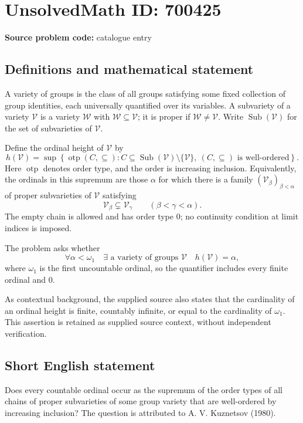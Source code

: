 \documentclass[11pt]{article}
\begin{document}
\section*{UnsolvedMath ID: 700425}
\textbf{Source problem code:} catalogue entry
\subsection{Definitions and mathematical statement}
A variety of groups is the class of all groups satisfying some fixed collection of group identities, each universally quantified over its variables. A subvariety of a variety \(\mathcal V\) is a variety \(\mathcal W\) with \(\mathcal W\subseteq\mathcal V\); it is proper if \(\mathcal W\ne\mathcal V\). Write \(\operatorname{Sub}(\mathcal V)\) for the set of subvarieties of \(\mathcal V\).

Define the ordinal height of \(\mathcal V\) by
\[
h(\mathcal V)=\sup\left\{\operatorname{otp}(C,\subseteq): C\subseteq\operatorname{Sub}(\mathcal V)\setminus\{\mathcal V\},\ (C,\subseteq)\text{ is well-ordered}\right\}.
\]
Here \(\operatorname{otp}\) denotes order type, and the order is increasing inclusion. Equivalently, the ordinals in this supremum are those \(\alpha\) for which there is a family \((\mathcal V_\beta)_{\beta<\alpha}\) of proper subvarieties of \(\mathcal V\) satisfying
\[
\mathcal V_\beta\subsetneq\mathcal V_\gamma\qquad(\beta<\gamma<\alpha).
\]
The empty chain is allowed and has order type \(0\); no continuity condition at limit indices is imposed.

The problem asks whether
\[
\forall\alpha<\omega_1\quad\exists\text{ a variety of groups }\mathcal V\quad h(\mathcal V)=\alpha,
\]
where \(\omega_1\) is the first uncountable ordinal, so the quantifier includes every finite ordinal and \(0\).

As contextual background, the supplied source also states that the cardinality of an ordinal height is finite, countably infinite, or equal to the cardinality of \(\omega_1\). This assertion is retained as supplied source context, without independent verification.
\subsection{Short English statement}
Does every countable ordinal occur as the supremum of the order types of all chains of proper subvarieties of some group variety that are well-ordered by increasing inclusion? The question is attributed to A. V. Kuznetsov (1980).
\end{document}

